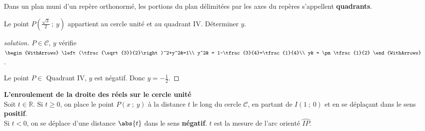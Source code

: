 \documentclass[main.tex]{subfiles}
\begin{document}
\begin{definition} Dans un plan muni d'un repère orthonormé, les portions du plan délimitées par les axes du repères s'appellent \textbf{quadrants}.
\end{definition}
\begin{example} Le point $P\left(\tfrac{\sqrt{3}}{2}~;~y\right)$ appartient au cercle unité et au quadrant \RN{4}. Déterminer $y$. 
\end{example}
\begin{proof}[solution] $P\in\mathscr{C}$, $y$ vérifie $\begin{WithArrows}
\left(\tfrac{\sqrt{3}}{2}\right)^2+y^2&=1\\	
y^2& = 1-\tfrac{3}{4}=\tfrac{1}{4}\\
y& = \pm \tfrac{1}{2}
\end{WithArrows}$.

Le point $P\in$ Quadrant \RN{4}, $y$ est négatif. Donc $y=-\tfrac{1}{2}$.
\end{proof}
\begin{tBox}\textbf{L'enroulement de la droite des réels sur le cercle unité} \\
Soit $t\in\mathbb{R}$. Si $t\geqslant 0$, on place le point $P(x~;~y)$ à la distance   $t$ le long du cercle $\mathscr{C}$, en partant de $I(1~;~0)$ et en se déplaçant dans le sens \textbf{positif}. \\
Si $t<0$, on se déplace d'une distance $\abs{t}$ dans le sens \textbf{négatif}. $t$ est la mesure de l'arc orienté $\wideparen{IP}$.
\end{tBox} 
\end{document}
